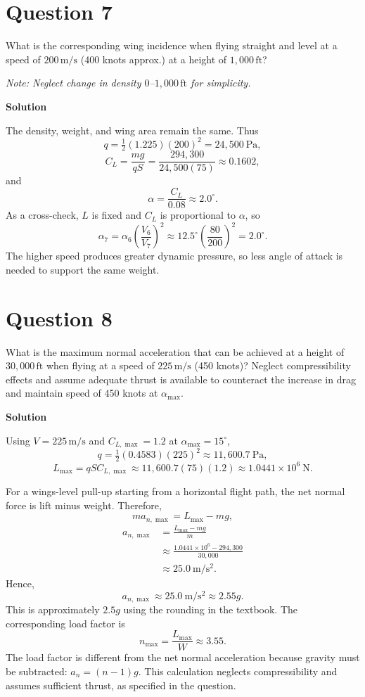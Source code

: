 \documentclass[12pt,a4paper]{article}
\begin{document}
\newpage
\section*{Question 7}
What is the corresponding wing incidence when flying straight and level at a speed
of $200\,\mathrm{m/s}$ (400 knots approx.) at a height of $1{,}000\,\mathrm{ft}$?

\textit{Note: Neglect change in density $0$--$1{,}000\,\mathrm{ft}$ for simplicity.}

\textbf{Solution}

The density, weight, and wing area remain the same. Thus
\[
q=\tfrac12(1.225)(200)^2=24{,}500\ \mathrm{Pa},
\]
\[
C_L=\frac{mg}{qS}=\frac{294{,}300}{24{,}500(75)}\approx0.1602,
\]
and
\[
\boxed{\alpha=\frac{C_L}{0.08}\approx2.0^\circ.}
\]
As a cross-check, $L$ is fixed and $C_L$ is proportional to $\alpha$, so
\[
\alpha_7=\alpha_6\left(\frac{V_6}{V_7}\right)^2
\approx12.5^\circ\left(\frac{80}{200}\right)^2
=2.0^\circ.
\]
The higher speed produces greater dynamic pressure, so less angle of attack is
needed to support the same weight.

\newpage
\section*{Question 8}
What is the maximum normal acceleration that can be achieved at a height of
$30{,}000\,\mathrm{ft}$ when flying at a speed of $225\,\mathrm{m/s}$ (450 knots)?
Neglect compressibility effects and assume adequate thrust is available to
counteract the increase in drag and maintain speed of 450 knots at $\alpha_{\max}$.

\textbf{Solution}

Using $V=225\,\mathrm{m/s}$ and $C_{L,\max}=1.2$ at $\alpha_{\max}=15^\circ$,
\[
q=\tfrac12(0.4583)(225)^2\approx11{,}600.7\ \mathrm{Pa},
\]
\[
L_{\max}=qSC_{L,\max}
\approx11{,}600.7(75)(1.2)
\approx1.0441\times10^6\ \mathrm{N}.
\]

For a wings-level pull-up starting from a horizontal flight path, the net normal
force is lift minus weight. Therefore,
\[
ma_{n,\max}=L_{\max}-mg,
\]
\[
\begin{aligned}
a_{n,\max}&=\frac{L_{\max}-mg}{m}\\
&\approx\frac{1.0441\times10^6-294{,}300}{30{,}000}\\
&\approx25.0\ \mathrm{m/s^2}.
\end{aligned}
\]
Hence,
\[
\boxed{a_{n,\max}\approx25.0\ \mathrm{m/s^2}\approx2.55g.}
\]
This is approximately $2.5g$ using the rounding in the textbook. The corresponding
load factor is
\[
n_{\max}=\frac{L_{\max}}{W}\approx3.55.
\]
The load factor is different from the net normal acceleration because gravity
must be subtracted: $a_n=(n-1)g$. This calculation neglects compressibility and
assumes sufficient thrust, as specified in the question.
\end{document}
